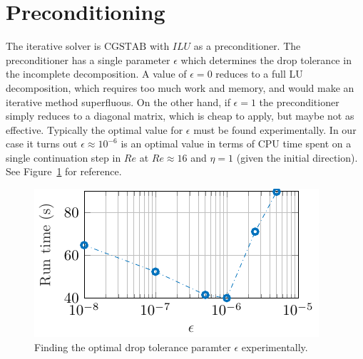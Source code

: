 \section{Preconditioning}

The iterative solver is $\textrm{CGSTAB}$ with $ILU$ as a preconditioner. The preconditioner has a single parameter $\epsilon$ which determines the drop tolerance in the incomplete decomposition. A value of $\epsilon = 0$ reduces to a full LU decomposition, which requires too much work and memory, and would make an iterative method superfluous. On the other hand, if $\epsilon = 1$ the preconditioner simply reduces to a diagonal matrix, which is cheap to apply, but maybe not as effective. Typically the optimal value for $\epsilon$ must be found experimentally. In our case it turns out $\epsilon \approx 10^{-6}$ is an optimal value in terms of CPU time spent on a single continuation step in $Re$ at $Re \approx 16$ and $\eta = 1$ (given the initial direction). See Figure~\ref{fig:optimal_epsilon} for reference.

\begin{figure}[h]
    \centering
    \includegraphics{images/droptol_epsilon.pdf}
    \caption{Finding the optimal drop tolerance paramter $\epsilon$ experimentally.}
    \label{fig:optimal_epsilon}
\end{figure}
